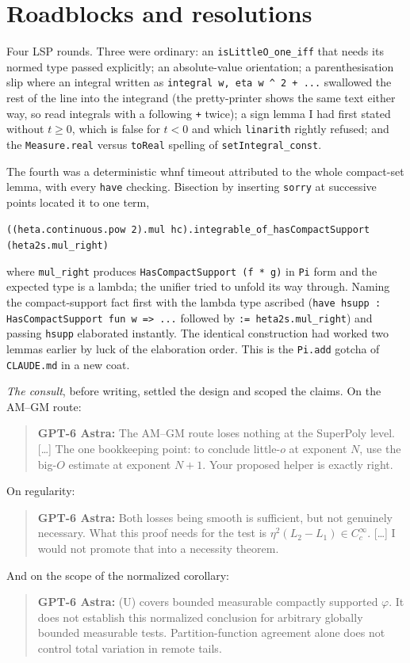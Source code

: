 \documentclass[11pt]{article}
\newcommand{\code}[1]{\texttt{#1}}
\newcommand{\gptbox}[1]{\par\medskip\begin{quote}\small\textbf{\textcolor{green!50!black}{GPT-6 Astra:}} #1\end{quote}\medskip}
\begin{document}
\section{Roadblocks and resolutions}

Four LSP rounds. Three were ordinary: an \code{isLittleO\_one\_iff} that
needs its normed type passed explicitly; an absolute-value orientation;
a parenthesisation slip where an integral written as
\code{integral w, eta w \^{} 2 + ...} swallowed the rest of the line into
the integrand (the pretty-printer shows the same
text either way, so read integrals with a following \code{+} twice); a
sign lemma I had first stated without $t \ge 0$, which is false for
$t < 0$ and which \code{linarith} rightly refused; and the
\code{Measure.real} versus \code{toReal} spelling of
\code{setIntegral\_const}.

The fourth was a deterministic whnf timeout attributed to the whole
compact-set lemma, with every \code{have} checking. Bisection by
inserting \code{sorry} at successive points located it to one term,
\begin{center}
\code{((heta.continuous.pow 2).mul hc).integrable\_of\_hasCompactSupport}
\code{(heta2s.mul\_right)}
\end{center}
where \code{mul\_right} produces \code{HasCompactSupport (f * g)} in
\code{Pi} form and the expected type is a lambda; the unifier tried to
unfold its way through. Naming the compact-support fact first with the
lambda type ascribed (\code{have hsupp : HasCompactSupport fun w => ...}
followed by \code{:= heta2s.mul\_right}) and passing \code{hsupp} elaborated instantly. The
identical construction had worked two lemmas earlier by luck of the
elaboration order. This is the \code{Pi.add} gotcha of \code{CLAUDE.md}
in a new coat.

\emph{The consult}, before writing, settled the design and scoped the
claims. On the AM--GM route:
\gptbox{The AM--GM route loses nothing at the SuperPoly level. [\ldots]
The one bookkeeping point: to conclude little-$o$ at exponent $N$, use
the big-$O$ estimate at exponent $N + 1$. Your proposed helper is
exactly right.}
On regularity:
\gptbox{Both losses being smooth is sufficient, but not genuinely
necessary. What this proof needs for the test is $\eta^2(L_2 - L_1) \in
C_c^\infty$. [\ldots] I would not promote that into a necessity theorem.}
And on the scope of the normalized corollary:
\gptbox{(U) covers bounded measurable compactly supported $\varphi$. It
does not establish this normalized conclusion for arbitrary globally
bounded measurable tests. Partition-function agreement alone does not
control total variation in remote tails.}
\end{document}
